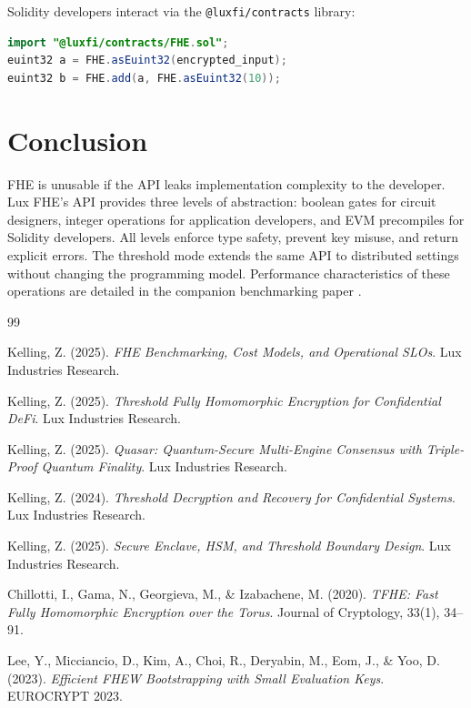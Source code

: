 \documentclass[11pt]{article}
\begin{document}
Solidity developers interact via the \texttt{@luxfi/contracts} library:

\begin{lstlisting}[language=Java]
import "@luxfi/contracts/FHE.sol";
euint32 a = FHE.asEuint32(encrypted_input);
euint32 b = FHE.add(a, FHE.asEuint32(10));
\end{lstlisting}

\section{Conclusion}

FHE is unusable if the API leaks implementation complexity to the developer. Lux FHE's API provides three levels of abstraction: boolean gates for circuit designers, integer operations for application developers, and EVM precompiles for Solidity developers. All levels enforce type safety, prevent key misuse, and return explicit errors. The threshold mode extends the same API to distributed settings without changing the programming model. Performance characteristics of these operations are detailed in the companion benchmarking paper \cite{fhe-benchmarks}.

\begin{thebibliography}{99}

Kelling, Z. (2025).
\textit{FHE Benchmarking, Cost Models, and Operational SLOs}.
Lux Industries Research.

Kelling, Z. (2025).
\textit{Threshold Fully Homomorphic Encryption for Confidential DeFi}.
Lux Industries Research.

Kelling, Z. (2025).
\textit{Quasar: Quantum-Secure Multi-Engine Consensus with Triple-Proof Quantum Finality}.
Lux Industries Research.

Kelling, Z. (2024).
\textit{Threshold Decryption and Recovery for Confidential Systems}.
Lux Industries Research.

Kelling, Z. (2025).
\textit{Secure Enclave, HSM, and Threshold Boundary Design}.
Lux Industries Research.

Chillotti, I., Gama, N., Georgieva, M., \& Izabachene, M. (2020).
\textit{TFHE: Fast Fully Homomorphic Encryption over the Torus}.
Journal of Cryptology, 33(1), 34--91.

Lee, Y., Micciancio, D., Kim, A., Choi, R., Deryabin, M., Eom, J., \& Yoo, D. (2023).
\textit{Efficient FHEW Bootstrapping with Small Evaluation Keys}.
EUROCRYPT 2023.

\end{thebibliography}
\end{document}
